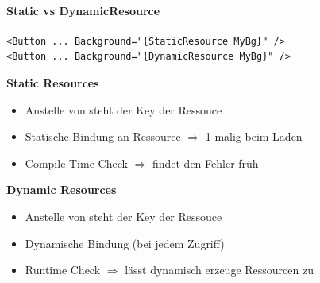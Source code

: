 
\paragraph{Static vs DynamicResource}
\begin{lstlisting}[language=xaml]
<Button ... Background="{StaticResource MyBg}" />
<Button ... Background="{DynamicResource MyBg}" />
\end{lstlisting}

\textbf{Static Resources}
\begin{itemize}
    \item Anstelle von  steht der Key der Ressouce
    \item Statische Bindung an Ressource $\Longrightarrow$ 1-malig beim Laden
    \item Compile Time Check $\Longrightarrow$ findet den Fehler früh 
\end{itemize}
\textbf{Dynamic Resources}
\begin{itemize}
    \item Anstelle von  steht der Key der Ressouce
    \item Dynamische Bindung (bei jedem Zugriff)
    \item Runtime Check $\Longrightarrow$ lässt dynamisch erzeuge Ressourcen zu
\end{itemize}


